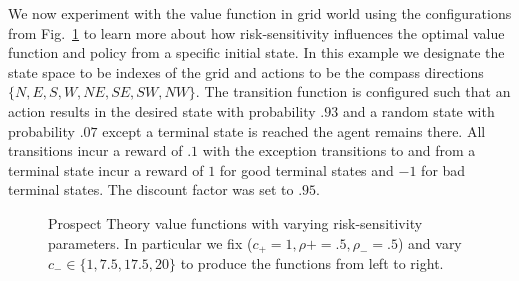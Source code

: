 \documentclass{article}
\begin{document}
We now experiment with the value function in grid world using the configurations from Fig.~\ref{fig:prospect} to learn more about how risk-sensitivity influences the optimal value function and policy from a specific initial state. In this example we designate the state space to be indexes of the grid and actions to be the compass directions $\{N, E, S, W, NE, SE, SW, NW\}$. The transition function is configured such that an action results in the desired state with probability $.93$ and a random state with probability $.07$ except a terminal state is reached the agent remains there. All transitions incur a reward of $.1$ with the exception transitions to and from a terminal state incur a reward of $1$ for good terminal states and $-1$ for bad terminal states. The discount factor was set to $.95$. 
\begin{figure}[t]
    \centering
    \hfill
    \hfill
    \hfill
    \caption{Prospect Theory value functions with varying risk-sensitivity parameters. In particular we fix ($c_+=1, \rho+=.5, \rho_-=.5$) and vary $c_- \in \{1, 7.5, 17.5, 20\}$ to produce the functions from left to right.}
    \label{fig:prospect}
\end{figure}
\end{document}
